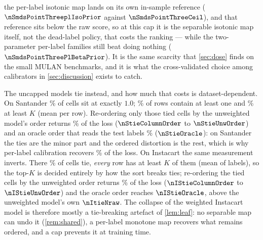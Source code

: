 \documentclass[sigconf,nonacm]{acmart}
\begin{document}
the per-label isotonic map lands on its own in-sample reference ($\nSmdsPointThreeplIsoPrior$ against $\nSmdsPointThreeCeil$), and that reference sits below the raw score, so at this cap it is the separable isotonic map itself, not the dead-label policy, that costs the ranking --- while the two-parameter per-label families still beat doing nothing ($\nSmdsPointThreePlBetaPrior$). It is the same scarcity that \cref{sec:dose} finds on the small MULAN benchmarks, and it is what the cross-validated choice among calibrators in \cref{sec:discussion} exists to catch.

The uncapped models tie instead, and how much that costs is dataset-dependent. On Santander \nStieCellsExactOne\% of cells sit at exactly $1.0$; \nStieRowsGeOne\% of rows contain at least one and \nStieRowsGeK\% at least $K$ (mean \nStieCellsPerRowMean{} per row). Re-ordering only those tied cells by the unweighted model's order returns \ntieShareUnw\% of the loss ($\nStieColumnOrder$ to $\nStieUnwOrder$) and an oracle order that reads the test labels \ntieShareOracle\% ($\nStieOracle$): on Santander the ties are the minor part and the ordered distortion is the rest, which is why per-label calibration recovers \nrepairShare\% of the loss. On Instacart the same measurement inverts. There \nIStieCellsExactOne\% of cells tie, \emph{every} row has at least $K$ of them (mean \nIStieCellsPerRowMean{} of \nInLabels{} labels), so the top-$K$ is decided entirely by how the sort breaks ties; re-ordering the tied cells by the unweighted order returns \nItieShareUnw\% of the loss ($\nIStieColumnOrder$ to $\nIStieUnwOrder$) and the oracle order reaches $\nIStieOracle$, above the unweighted model's own $\nItieNraw$. The collapse of the weighted Instacart model is therefore mostly a tie-breaking artefact of \cref{lem:leaf}: no separable map can undo it (\cref{rem:shared}), a per-label monotone map recovers what remains ordered, and a cap prevents it at training time.
\end{document}
